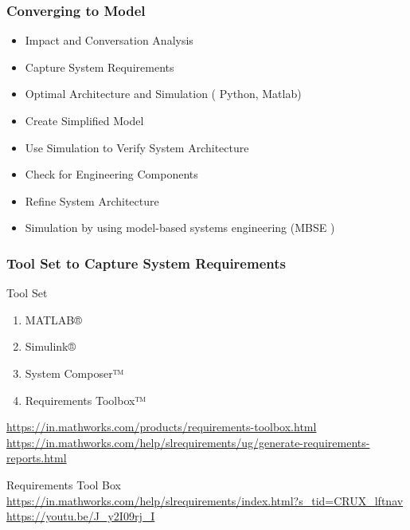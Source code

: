 
\begin{frame}
\frametitle{Converging to Model}
\begin{itemize}
\item Impact and Conversation Analysis
\item Capture System Requirements
\item Optimal Architecture and Simulation ( Python, Matlab)
\item Create Simplified Model
\item Use Simulation to Verify System Architecture
\item Check for Engineering Components
\item Refine  System Architecture
\item  Simulation by using model-based systems engineering (MBSE )
\end{itemize}
\end{frame}



\begin{frame}
\frametitle{Tool Set to Capture System Requirements }
\begin{block}{ Tool Set}
\begin{enumerate}
 \setlength{\itemsep}{0pt}
    \item  MATLAB®
    \item  Simulink®
    \item  System Composer™ 
    \item  Requirements Toolbox™
\end{enumerate}

\url{https://in.mathworks.com/products/requirements-toolbox.html}
\url{https://in.mathworks.com/help/slrequirements/ug/generate-requirements-reports.html}
\newline 

Requirements Tool Box
\newline 
\url{https://in.mathworks.com/help/slrequirements/index.html?s_tid=CRUX_lftnav}
\url{https://youtu.be/J_y2I09rj_I}
\end{block}
\end{frame}

